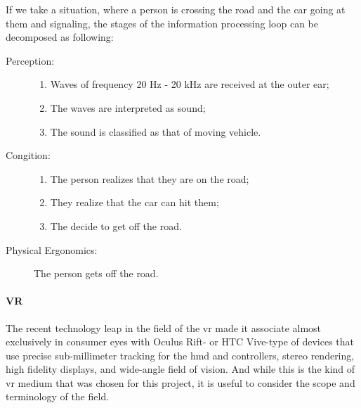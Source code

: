 If we take a situation, where a person is crossing the road and the car going at them and signaling, the stages of the information processing loop can be decomposed as following:
\begin{description}
	\item[Perception:] \hfill
		
		\begin{enumerate}
			\item Waves of frequency 20 Hz - 20 kHz are received at the outer ear;
			\item The waves are interpreted as sound;
			\item The sound is classified as that of moving vehicle.
		\end{enumerate}
	\item[Congition:] \hfill
		
		\begin{enumerate}
			\item The person realizes that they are on the road;
			\item They realize that the car can hit them;
			\item The decide to get off the road.
		\end{enumerate}
	\item[Physical Ergonomics:] \hfill
			
			The person gets off the road.
		
\end{description}

\paragraph{VR}
The recent technology leap in the field of the \gls{vr} made it associate almost exclusively in consumer eyes with Oculus Rift- or HTC Vive-type of devices that use precise sub-millimeter tracking for the \gls{hmd} and controllers, stereo rendering, high fidelity displays, and wide-angle field of vision. And while this is the kind of \gls{vr} medium that was chosen for this project, it is useful to consider the scope and terminology of the field.

